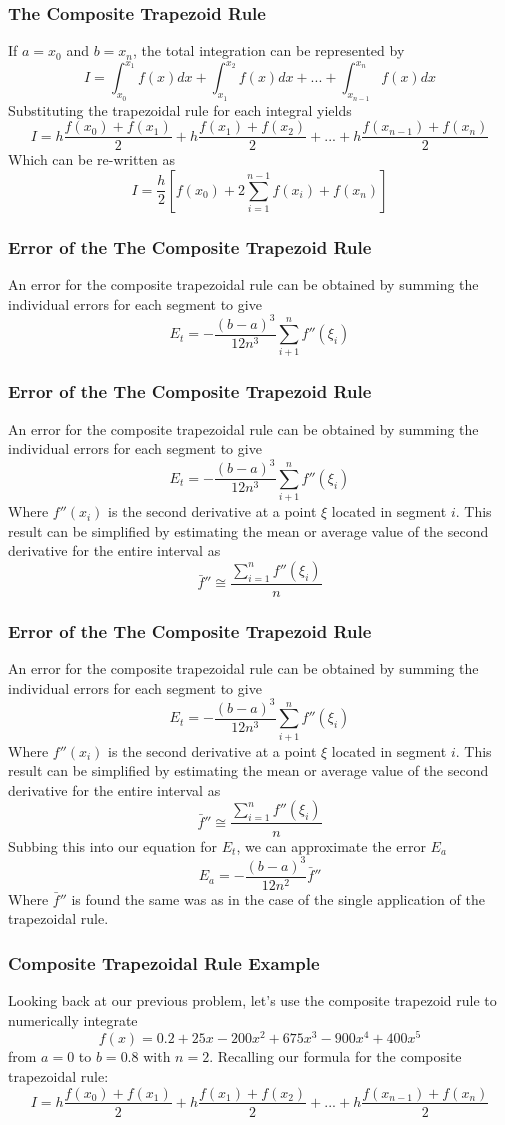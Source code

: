 \documentclass{if-beamer}
\begin{document}
\begin{frame}
	\frametitle{The Composite Trapezoid Rule}
	If $a = x_0$ and $b=x_n$, the total integration can be represented by
	$$ I = \int_{x_0}^{x_1}f(x)dx + \int_{x_1}^{x_2}f(x)dx + ... + \int_{x_{n-1}}^{x_n}f(x)dx$$
	Substituting the trapezoidal rule for each integral yields
	$$I = h\frac{f(x_0)+f(x_1)}{2}+h\frac{f(x_1)+f(x_2)}{2}+...+h\frac{f(x_{n-1})+f(x_n)}{2}$$
	Which can be re-written as
	$$ I = \frac{h}{2}\left[f(x_0)+2\sum_{i=1}^{n-1}f(x_i)+f(x_n)\right]$$
\end{frame}

\begin{frame}
	\frametitle{Error of the The Composite Trapezoid Rule}
	An error for the composite trapezoidal rule can be obtained by summing the individual
	errors for each segment to give
	$$ E_t = -\frac{(b-a)^3}{12n^3}\sum_{i+1}^{n}f''(\xi_i)$$
	
\end{frame}

\begin{frame}
	\frametitle{Error of the The Composite Trapezoid Rule}
	An error for the composite trapezoidal rule can be obtained by summing the individual
	errors for each segment to give
	$$ E_t = -\frac{(b-a)^3}{12n^3}\sum_{i+1}^{n}f''(\xi_i)$$
	Where $f''(x_i)$ is the second derivative at a point $\xi$ located in segment $i$. This result can be simplified by estimating the mean or average value of the second derivative for the entire interval as
	$$\bar{f}''\cong \frac{\sum_{i=1}^{n}f''(\xi_i)}{n} $$
	
\end{frame}

\begin{frame}
	\frametitle{Error of the The Composite Trapezoid Rule}
	An error for the composite trapezoidal rule can be obtained by summing the individual
	errors for each segment to give
	$$ E_t = -\frac{(b-a)^3}{12n^3}\sum_{i+1}^{n}f''(\xi_i)$$
	Where $f''(x_i)$ is the second derivative at a point $\xi$ located in segment $i$. This result can be simplified by estimating the mean or average value of the second derivative for the entire interval as
	$$\bar{f}''\cong \frac{\sum_{i=1}^{n}f''(\xi_i)}{n} $$
	Subbing this into our equation for $E_t$, we can approximate the error $E_a$
	$$E_a = -\frac{(b-a)^3}{12n^2}\bar{f}''$$
	Where $\bar{f}''$ is found the same was as in the case of the single application of the trapezoidal rule.
\end{frame}

\begin{frame}
	\frametitle{Composite Trapezoidal Rule Example}
	Looking back at our previous problem, let's use the composite trapezoid rule to numerically integrate
	$$f(x) =0.2+25x-200x^2+675x^3-900x^4+400x^5$$
	from $a = 0$ to $b=0.8$ with $n = 2$. Recalling our formula for the composite trapezoidal rule:
	$$I = h\frac{f(x_0)+f(x_1)}{2}+h\frac{f(x_1)+f(x_2)}{2}+...+h\frac{f(x_{n-1})+f(x_n)}{2}$$
	
\end{frame}
\end{document}
